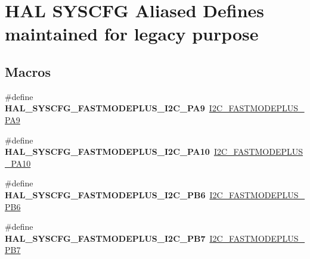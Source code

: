 \hypertarget{group___h_a_l___s_y_s_c_f_g___aliased___defines}{}\section{H\+AL S\+Y\+S\+C\+FG Aliased Defines maintained for legacy purpose}
\label{group___h_a_l___s_y_s_c_f_g___aliased___defines}
\subsection*{Macros}
\begin{DoxyCompactItemize}
\item 
\mbox{\label{group___h_a_l___s_y_s_c_f_g___aliased___defines_gab49ca938ca8481b3bd783423f840c1bd}} 
\#define {\bfseries H\+A\+L\+\_\+\+S\+Y\+S\+C\+F\+G\+\_\+\+F\+A\+S\+T\+M\+O\+D\+E\+P\+L\+U\+S\+\_\+\+I2\+C\+\_\+\+P\+A9}~\hyperlink{group___i2_c_ex___fast_mode_plus_ga2e335d4993c228bb7aa778890e29ce57}{I2\+C\+\_\+\+F\+A\+S\+T\+M\+O\+D\+E\+P\+L\+U\+S\+\_\+\+P\+A9}
\item 
\mbox{\label{group___h_a_l___s_y_s_c_f_g___aliased___defines_ga51ca865a9860b7a43fbb46fb768e3657}} 
\#define {\bfseries H\+A\+L\+\_\+\+S\+Y\+S\+C\+F\+G\+\_\+\+F\+A\+S\+T\+M\+O\+D\+E\+P\+L\+U\+S\+\_\+\+I2\+C\+\_\+\+P\+A10}~\hyperlink{group___i2_c_ex___fast_mode_plus_gacef0dcd4551b31cb585fa7e7044a50da}{I2\+C\+\_\+\+F\+A\+S\+T\+M\+O\+D\+E\+P\+L\+U\+S\+\_\+\+P\+A10}
\item 
\mbox{\label{group___h_a_l___s_y_s_c_f_g___aliased___defines_ga615cfdee08ad61f7b1581775e4e0385e}} 
\#define {\bfseries H\+A\+L\+\_\+\+S\+Y\+S\+C\+F\+G\+\_\+\+F\+A\+S\+T\+M\+O\+D\+E\+P\+L\+U\+S\+\_\+\+I2\+C\+\_\+\+P\+B6}~\hyperlink{group___i2_c_ex___fast_mode_plus_ga9b3b77b0f00f09ee6d272d70dd5663f5}{I2\+C\+\_\+\+F\+A\+S\+T\+M\+O\+D\+E\+P\+L\+U\+S\+\_\+\+P\+B6}
\item 
\mbox{\label{group___h_a_l___s_y_s_c_f_g___aliased___defines_gaacdf5fce976c3d425f3aac760f4dc90d}} 
\#define {\bfseries H\+A\+L\+\_\+\+S\+Y\+S\+C\+F\+G\+\_\+\+F\+A\+S\+T\+M\+O\+D\+E\+P\+L\+U\+S\+\_\+\+I2\+C\+\_\+\+P\+B7}~\hyperlink{group___i2_c_ex___fast_mode_plus_gaaa6d3f6c1d635a2f5e4dbe2ef66ce1c3}{I2\+C\+\_\+\+F\+A\+S\+T\+M\+O\+D\+E\+P\+L\+U\+S\+\_\+\+P\+B7}

\end{DoxyCompactItemize}

